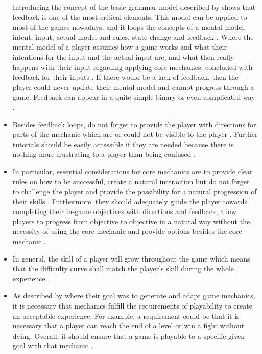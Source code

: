 \documentclass[MGS,Master,english]{twbook}%
\begin{document}
\begin{itemize}
	Introducing the concept of the basic grammar model described by \citep{mechanic::BasicGrammarModel} shows that feedback is one of the most critical elements. This model can be applied to most of the games nowadays, and it loops the concepts of a mental model, intent, input, actual model and rules, state change and feedback \cite{mechanic::BasicGrammarModel}. Where the mental model of a player assumes how a game works and what their intentions for the input and the actual input are, and what then really happens with their input regarding applying core mechanics, concluded with feedback for their inputs \cite{mechanic::BasicGrammarModel}. If there would be a lack of feedback, then the player could never update their mental model and cannot progress through a game. Feedback can appear in a quite simple binary or even complicated way \cite{mechanic::BasicGrammarModel}.
	\item Besides feedback loops, do not forget to provide the player with directions for parts of the mechanic which are or could not be visible to the player \cite{mechanic::gamasutra::MaxPears}. Further tutorials should be easily accessible if they are needed because there is nothing more frustrating to a player than being confused \cite{mechanic::gamasutra::DanielDoan}.
	\item In particular, essential considerations for core mechanics are to provide clear rules on how to be successful, create a natural interaction but do not forget to challenge the player and provide the possibility for a natural progression of their skills \cite{mechanic::gamasutra::DanielDoan}. Furthermore, they should adequately guide the player towards completing their in-game objectives with directions and feedback, allow players to progress from objective to objective in a natural way without the necessity of using the core mechanic and provide options besides the core mechanic \cite{mechanic::gamasutra::DanielDoan}. 
	\item In general, the skill of a player will grow throughout the game which means that the difficulty curve shall match the player's skill during the whole experience \cite{mechanic::gamasutra::DanielDoan}. 
	\item As described by \citep{mechanic::generateAndAdaptingMechanics} where their goal was to generate and adapt game mechanics, it is necessary that mechanics fulfill the requirements of playability to create an acceptable experience. For example, a requirement could be that it is necessary that a player can reach the end of a level or win a fight without dying. Overall, it should ensure that a game is playable to a specific given goal with that mechanic \cite{mechanic::generateAndAdaptingMechanics}.
\end{itemize} 
\end{document}
